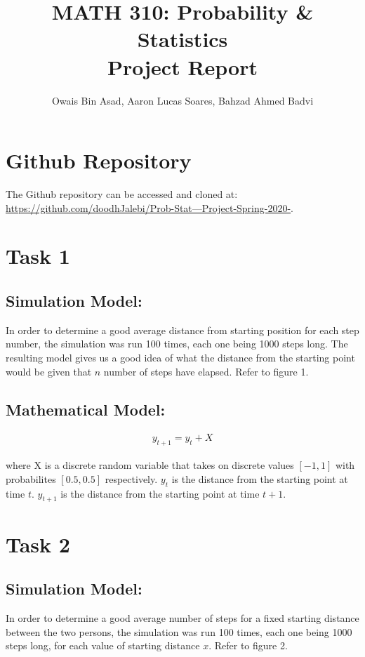\documentclass[10pt, a4paper]{article}
\begin{document}
    
\title{MATH 310: Probability \& Statistics \\Project Report}
\author{Owais Bin Asad, Aaron Lucas Soares, Bahzad Ahmed Badvi}

\maketitle

\section*{Github Repository}
The Github repository can be accessed and cloned at: \href{https://github.com/doodhJalebi/Prob-Stat---Project-Spring-2020-}{https://github.com/doodhJalebi/Prob-Stat---Project-Spring-2020-}.

\section*{Task 1}
\subsection*{Simulation Model:}
In order to determine a good average distance from starting position for each step number, the simulation was run
100 times, each one being 1000 steps long. The resulting model gives us a good idea of what the
distance from the starting point would be given that $n$ number of steps have elapsed. Refer to figure 1.

\subsection*{Mathematical Model:}
\begin{align*}
    y_{t+1} = y_{t} + X
\end{align*}

where X is a discrete random variable that takes on discrete values $[-1, 1]$ with probabilites $[0.5, 0.5]$ respectively.
$y_t$ is the distance from the starting point at time $t$. $y_{t+1}$ is the distance from the starting point at time $t+1$.


\section*{Task 2}
\subsection*{Simulation Model:}
In order to determine a good average number of steps for a fixed starting distance between the two persons, the simulation was run
100 times, each one being 1000 steps long, for each value of starting distance $x$. Refer to figure 2.
\end{document}

